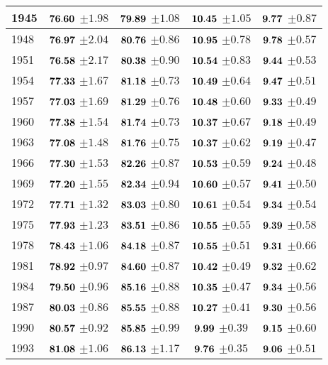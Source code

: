 \documentclass[10pt, titlepage]{article}%
\begin{document}
\begin{table}
\begin{tabular}{||l|c|c|c|c||}
  1945 &  $\bf 76.60$ $\pm 1.98$& $\bf 79.89$ $\pm 1.08$& $\bf 10.45$ $\pm 1.05$& $\bf 9.77$ $\pm 0.87$ \\ \hline\hline
  1948 &  $\bf 76.97$ $\pm 2.04$& $\bf 80.76$ $\pm 0.86$& $\bf 10.95$ $\pm 0.78$& $\bf 9.78$ $\pm 0.57$ \\ \hline\hline
  1951 &  $\bf 76.58$ $\pm 2.17$& $\bf 80.38$ $\pm 0.90$& $\bf 10.54$ $\pm 0.83$& $\bf 9.44$ $\pm 0.53$ \\ \hline\hline
  1954 &  $\bf 77.33$ $\pm 1.67$& $\bf 81.18$ $\pm 0.73$& $\bf 10.49$ $\pm 0.64$& $\bf 9.47$ $\pm 0.51$ \\ \hline\hline
  1957 &  $\bf 77.03$ $\pm 1.69$& $\bf 81.29$ $\pm 0.76$& $\bf 10.48$ $\pm 0.60$& $\bf 9.33$ $\pm 0.49$ \\ \hline\hline
  1960 &  $\bf 77.38$ $\pm 1.54$& $\bf 81.74$ $\pm 0.73$& $\bf 10.37$ $\pm 0.67$& $\bf 9.18$ $\pm 0.49$ \\ \hline\hline
  1963 &  $\bf 77.08$ $\pm 1.48$& $\bf 81.76$ $\pm 0.75$& $\bf 10.37$ $\pm 0.62$& $\bf 9.19$ $\pm 0.47$ \\ \hline\hline
  1966 &  $\bf 77.30$ $\pm 1.53$& $\bf 82.26$ $\pm 0.87$& $\bf 10.53$ $\pm 0.59$& $\bf 9.24$ $\pm 0.48$ \\ \hline\hline
  1969 &  $\bf 77.20$ $\pm 1.55$& $\bf 82.34$ $\pm 0.94$& $\bf 10.60$ $\pm 0.57$& $\bf 9.41$ $\pm 0.50$ \\ \hline\hline
  1972 &  $\bf 77.71$ $\pm 1.32$& $\bf 83.03$ $\pm 0.80$& $\bf 10.61$ $\pm 0.54$& $\bf 9.34$ $\pm 0.54$ \\ \hline\hline
  1975 &  $\bf 77.93$ $\pm 1.23$& $\bf 83.51$ $\pm 0.86$& $\bf 10.55$ $\pm 0.55$& $\bf 9.39$ $\pm 0.58$ \\ \hline\hline
  1978 &  $\bf 78.43$ $\pm 1.06$& $\bf 84.18$ $\pm 0.87$& $\bf 10.55$ $\pm 0.51$& $\bf 9.31$ $\pm 0.66$ \\ \hline\hline
  1981 &  $\bf 78.92$ $\pm 0.97$& $\bf 84.60$ $\pm 0.87$& $\bf 10.42$ $\pm 0.49$& $\bf 9.32$ $\pm 0.62$ \\ \hline\hline
  1984 &  $\bf 79.50$ $\pm 0.96$& $\bf 85.16$ $\pm 0.88$& $\bf 10.35$ $\pm 0.47$& $\bf 9.34$ $\pm 0.56$ \\ \hline\hline
  1987 &  $\bf 80.03$ $\pm 0.86$& $\bf 85.55$ $\pm 0.88$& $\bf 10.27$ $\pm 0.41$& $\bf 9.30$ $\pm 0.56$ \\ \hline\hline
  1990 &  $\bf 80.57$ $\pm 0.92$& $\bf 85.85$ $\pm 0.99$& $\bf 9.99$ $\pm 0.39$& $\bf 9.15$ $\pm 0.60$ \\ \hline\hline
  1993 &  $\bf 81.08$ $\pm 1.06$& $\bf 86.13$ $\pm 1.17$& $\bf 9.76$ $\pm 0.35$& $\bf 9.06$ $\pm 0.51$ \\ \hline\hline

\end{tabular}
\end{table}
\end{document}
